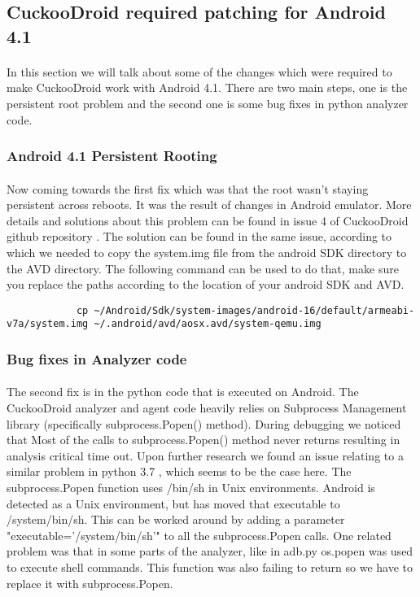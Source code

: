 \documentclass[../main.tex]{subfile}
\begin{document}
		\subsection{CuckooDroid required patching for Android 4.1}\label{sec:cuckoodroid_patching}
		\paragraph{} In this section we will talk about some of the changes which were required to make CuckooDroid work with Android 4.1. There are two main steps, one is the persistent root problem and the second one is some bug fixes in python analyzer code.
		
		\subsubsection{Android 4.1 Persistent Rooting}
		\paragraph{} Now coming towards the first fix which was that the root wasn't staying persistent across reboots. It was the result of changes in Android emulator. More details and solutions about this problem can be found in issue 4 of CuckooDroid github repository \cite{cuckoodroid_root_issue}. The solution can be found in the same issue, according to which we needed to copy the system.img file from the android SDK directory to the AVD directory. The following command can be used to do that, make sure you replace the paths according to the location of your android SDK and AVD.
		\begin{lstlisting}
			cp ~/Android/Sdk/system-images/android-16/default/armeabi-v7a/system.img ~/.android/avd/aosx.avd/system-qemu.img
		\end{lstlisting}
				
		\subsubsection{Bug fixes in Analyzer code}
		\paragraph{} The second fix is in the python code that is executed on Android. The CuckooDroid analyzer and agent code heavily relies on Subprocess Management library \cite{subprocess_management_library} (specifically subprocess.Popen() method). During debugging we noticed that Most of the calls to subprocess.Popen() method never returns resulting in analysis critical time out. Upon further research we found an issue relating to a similar problem in python 3.7 \cite{subprocess.popen_issue16255}, which seems to be the case here. The subprocess.Popen function uses /bin/sh in Unix environments. Android is detected as a Unix environment, but has moved that executable to /system/bin/sh. This can be worked around by adding a parameter "executable='/system/bin/sh'" to all the subprocess.Popen calls. One related problem was that in some parts of the analyzer, like in adb.py os.popen was used to execute shell commands. This function was also failing to return so we have to replace it with subprocess.Popen.
		
\end{document}
